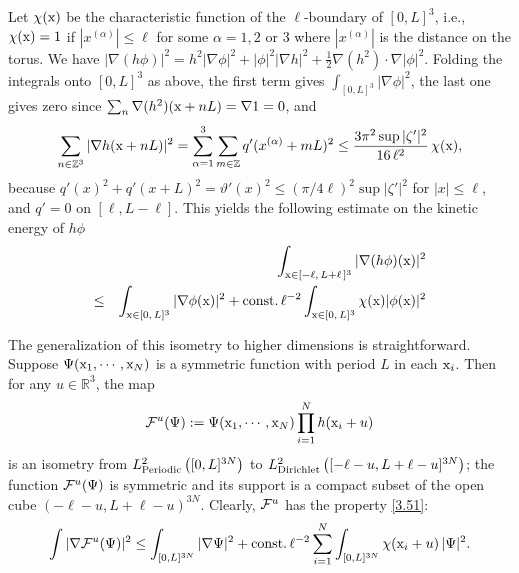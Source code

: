 \documentclass[11pt]{article}
\numberwithin{equation}{section}
\newcommand{\x}{{\rm x}}
\newcommand{\beq}{\begin{equation}}
\newcommand{\eeq}{\end{equation}}
\newcommand{\beqa}{\begin{eqnarray}}
\newcommand{\eeqa}{\end{eqnarray}}
\newcommand\Z{{\mathbb Z}}
\newcommand\R{{\mathbb R}}
\newcommand\const{{\rm const.\, }}
\theoremstyle{definition}
\begin{document}
Let $\chi (\x)$ be the characteristic function of the $\ell$-boundary of $[0,L]^3$, i.e.,
$\chi (\x)=1$ if   $|x^{(\alpha)} |\le \ell$ for some $\alpha = 1, 2$ or $3$ where $|x^{(\alpha)} |$
is  the distance on the torus.
We have $|\nabla (h\phi)|^2=h^2|\nabla\phi|^2+|\phi|^2|\nabla h|^2+\frac12\nabla(h^2)\cdot\nabla|\phi|^2$.
Folding the integrals onto $[0,L]^3$ as above, the first term gives $\int_{[0,L]^3}|\nabla\phi|^2$, the last one gives zero since
$\sum_n\nabla(h^2)(\x+nL)=\nabla 1=0$, and
\[
\sum_{n\in\Z^3}|\nabla h(\x+nL)|^2=\sum_{\alpha=1}^3\sum_{m\in\Z}q'(x^{(\alpha)}+mL)^2\leq \frac{3\pi^2\sup|\zeta'|^2}{16\,\ell^2}\,\chi(\x) ,
\]
because $q'(x)^2+q'(x+L)^2=\vartheta'(x)^2\leq (\pi/4\ell)^2\sup|\zeta'|^2$ for $|x|\leq \ell$, and $q'=0$ on $[\ell,L-\ell]$.
This yields the following estimate on the kinetic energy of  $h \phi$
\beqa\label{3.51}
&&\int_{\x\in[-\ell,\,L+\ell\,]^3}|\nabla (h  \phi)(\x)|^2\\\nonumber
\leq &&\int_{\x\in[0,\,L]^3}|\nabla \phi(\x)|^2+\const\ell^{-2}\int_{\x\in[0,\,L]^3}  \chi (\x) | \phi(\x)|^2
\eeqa

The generalization of this isometry to higher dimensions is straightforward.  Suppose
$\Psi(\x_1,\cdots,\x_N)$ is a symmetric function with period $L$ in each $\x_i$.
Then  for any $u \in \R^{3}$, the map
 \beq\label{defFu}
{\cal F}^u(\Psi): = \Psi (\x_1,\cdots,\x_N) \prod_{i=1}^N h(\x_i+u)
\eeq
is an  isometry from $L^2_{
{\rm Periodic}}\left([0,L]^{3N}\right)$ to $ L^2_{
{\rm Dirichlet}}\left([-\ell-u,L+\ell-u]^{3N}\right)$; the function ${\cal F}^u(\Psi)$ is symmetric and its support is a compact subset of the open cube $(-\ell-u,L+\ell-u)^{3N}$.
Clearly,   ${\cal F}^u$ has the property \eqref{3.51}:
\[
\int|\nabla {\cal F}^u(\Psi)|^2\leq \int_{[0,L]^{3N}}|\nabla\Psi|^2+\const\ell^{-2}\sum_{i=1}^N\int_{[0,L]^{3N}}\chi(\x_i+u)\,|\Psi|^2 .
\]
\end{document}
